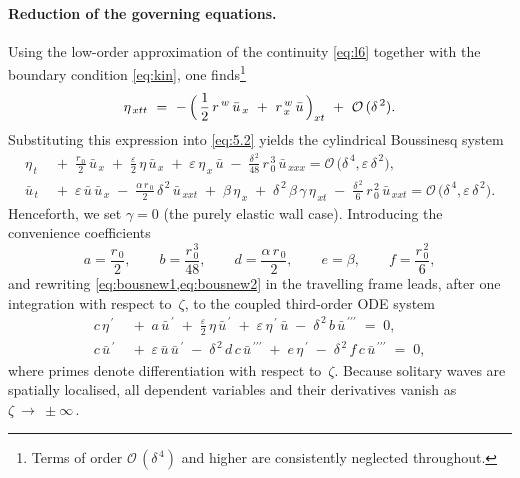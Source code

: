 \documentclass[alpha-refs, 12pt]{wiley-article}
\renewcommand{\O}{\mathcal{O}}
\newcommand{\eps}{\varepsilon}
\begin{document}
\paragraph{Reduction of the governing equations.} Using the low-order approximation of the continuity \cref{eq:l6} together with the boundary condition \eqref{eq:kin}, one finds\footnote{Terms of order $\O\,(\delta^{\,4})$ and higher are consistently neglected throughout.}
\begin{equation*}
  \eta_{\,x t t}\ =\ -\,\Bigl(\,\frac{1}{2}\,r^{\,w}\,\bar{u}_{\,x}\ +\ r^{\,w}_{\,x}\,\bar{u}\,\Bigr)_{x t}\ +\ \O\,(\delta^{\,2}).
\end{equation*}
Substituting this expression into \cref{eq:5.2} yields the cylindrical Boussinesq system
\begin{align}
  \eta_{\,t}
  &\;+\; \frac{r_{\,0}}{2}\,\bar{u}_{\,x}
       \;+\;\frac{\eps}{2}\,\eta\,\bar{u}_{\,x}
       \;+\;\eps\,\eta_{\,x}\,\bar{u}
       \;-\;\frac{\delta^{\,2}}{48}\,r_{\,0}^{\,3}\,\bar{u}_{\,xxx}
       =\O\,\bigl(\delta^{\,4},\eps\,\delta^{\,2}\bigr),
  \label{eq:bousnew1}\\
  \bar{u}_{\,t}
  &\;+\;\eps\,\bar{u}\,\bar{u}_{\,x}
       \;-\;\frac{\alpha\,r_{\,0}}{2}\,\delta^{\,2}\,\bar{u}_{\,xxt}
       \;+\;\beta\,\eta_{\,x}
       \;+\;\delta^{\,2}\,\beta\,\gamma\,\eta_{\,x t}
       \;-\;\frac{\delta^{\,2}}{6}\,r_{\,0}^{\,2}\,\bar{u}_{\,xxt}
       =\O\,\bigl(\delta^{\,4},\eps\,\delta^{\,2}\bigr).
  \label{eq:bousnew2}
\end{align}
Henceforth, we set $\gamma = 0$ (the purely elastic wall case). Introducing the convenience coefficients
\begin{equation*}
  a=\frac{r_{\,0}}{2}, \qquad
  b=\frac{r_{\,0}^{\,3}}{48}, \qquad
  d=\frac{\alpha\,r_{\,0}}{2}, \qquad
  e=\beta, \qquad
  f=\frac{r_{\,0}^{\,2}}{6},
\end{equation*}
and rewriting \cref{eq:bousnew1,eq:bousnew2} in the travelling frame leads, after one integration with respect to~$\zeta$, to the coupled third-order ODE system
\begin{align}
  c\,\eta^{\,\prime}
  &\;+\;a\,\bar{u}^{\,\prime}
       \;+\;\frac{\eps}{2}\,\eta\,\bar{u}^{\,\prime}
       \;+\;\eps\,\eta^{\,\prime}\,\bar{u}
       \;-\;\delta^{\,2}\,b\,\bar{u}^{\,\prime\prime\prime}
       \;=\;0,
  \label{eq:5.9a} \\
  c\,\bar{u}^{\,\prime}
  &\;+\;\eps\,\bar{u}\,\bar{u}^{\,\prime}
       \;-\;\delta^{\,2}\,d\,c\,\bar{u}^{\,\prime\prime\prime}
       \;+\;e\,\eta^{\,\prime}
       \;-\;\delta^{\,2}\,f\,c\,\bar{u}^{\,\prime\prime\prime}
       \;=\;0,
  \label{eq:5.10a}
\end{align}
where primes denote differentiation with respect to~$\zeta$. Because solitary waves are spatially localised, all dependent variables and their derivatives vanish as $\zeta\ \to\ \pm\infty\,$.
\end{document}
